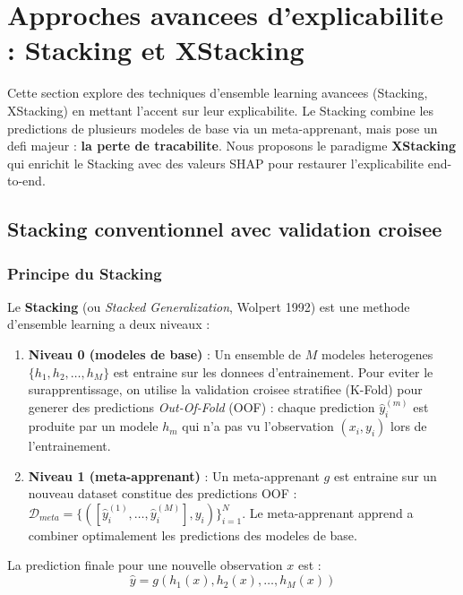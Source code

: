 \section{Approches avancees d'explicabilite : Stacking et XStacking}
\label{sec:cas4}

Cette section explore des techniques d'ensemble learning avancees (Stacking, XStacking) en mettant l'accent sur leur explicabilite. Le Stacking combine les predictions de plusieurs modeles de base via un meta-apprenant, mais pose un defi majeur : \textbf{la perte de tracabilite}. Nous proposons le paradigme \textbf{XStacking} qui enrichit le Stacking avec des valeurs SHAP pour restaurer l'explicabilite end-to-end.

\subsection{Stacking conventionnel avec validation croisee}
\label{ssec:cas4-stacking}

\subsubsection{Principe du Stacking}

Le \textbf{Stacking} (ou \textit{Stacked Generalization}, Wolpert 1992) est une methode d'ensemble learning a deux niveaux :
\begin{enumerate}
    \item \textbf{Niveau 0 (modeles de base)} : Un ensemble de $M$ modeles heterogenes $\{h_1, h_2, \ldots, h_M\}$ est entraine sur les donnees d'entrainement. Pour eviter le surapprentissage, on utilise la validation croisee stratifiee (K-Fold) pour generer des predictions \textit{Out-Of-Fold} (OOF) : chaque prediction $\hat{y}_i^{(m)}$ est produite par un modele $h_m$ qui n'a pas vu l'observation $(x_i, y_i)$ lors de l'entrainement.
    
    \item \textbf{Niveau 1 (meta-apprenant)} : Un meta-apprenant $g$ est entraine sur un nouveau dataset constitue des predictions OOF : $\mathcal{D}_{meta} = \{([\hat{y}_i^{(1)}, \ldots, \hat{y}_i^{(M)}], y_i)\}_{i=1}^N$. Le meta-apprenant apprend a combiner optimalement les predictions des modeles de base.
\end{enumerate}

La prediction finale pour une nouvelle observation $x$ est :
\begin{equation}
    \hat{y} = g(h_1(x), h_2(x), \ldots, h_M(x))
\end{equation}

